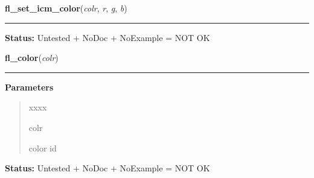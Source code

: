     \label{xformslib:library:fl_set_icm_color}

    \vspace{0.5ex}

\hspace{.8\funcindent}\begin{boxedminipage}{\funcwidth}

    \raggedright \textbf{fl\_set\_icm\_color}(\textit{colr}, \textit{r}, \textit{g}, \textit{b})

    \vspace{-1.5ex}

    \rule{\textwidth}{0.5\fboxrule}
\setlength{\parskip}{2ex}
\setlength{\parskip}{1ex}
\textbf{Status:} Untested + NoDoc + NoExample = NOT OK



    \end{boxedminipage}

    \label{xformslib:library:fl_color}

    \vspace{0.5ex}

\hspace{.8\funcindent}\begin{boxedminipage}{\funcwidth}

    \raggedright \textbf{fl\_color}(\textit{colr})

    \vspace{-1.5ex}

    \rule{\textwidth}{0.5\fboxrule}
\setlength{\parskip}{2ex}
\setlength{\parskip}{1ex}
      \textbf{Parameters}
      \vspace{-1ex}

      \begin{quote}
        \begin{Ventry}{xxxx}

          \item[colr]

          color id

        \end{Ventry}

      \end{quote}

\textbf{Status:} Untested + NoDoc + NoExample = NOT OK



    \end{boxedminipage}

